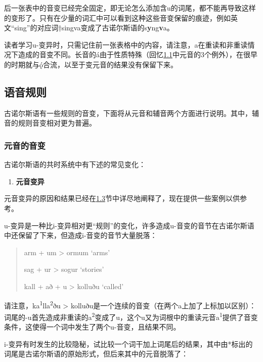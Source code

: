 后一张表中的音变已经完全固定，即无论怎么添加含u的词尾，都不能再导致这样的变形了。只有在少量的词汇中可以看到这种这些音变保留的痕迹，例如英文``sing''的对应词†singva变成了古诺尔斯语的s\textbf{y}ng\textbf{v}a。

读者学习u-变异时，只需记住前一张表格中的内容，请注意，a在重读和非重读情况下造成的音变不同。长音的á由于性质特殊（回忆\hyperref[ux4e66ux5199ux7cfbux7edfux548cux8bfbux97f3]{1.1}中元音的3个例外），在很早的时期就与ǫ́合流，以至于变元音的结果没有保留下来。

\subsection{语音规则}\label{ux8bedux97f3ux89c4ux5219}

古诺尔斯语有一些规则的音变，下面将从元音和辅音两个方面进行说明。其中，辅音的规则音变相对更为普遍。

\subsubsection{元音的音变}\label{ux5143ux97f3ux7684ux97f3ux53d8}

古诺尔斯语的共时系统中有下述的常见变化：

\begin{enumerate}
  \def\labelenumi{\Alph{enumi}.}
  \item
        \label{_Ref117017033}{}\textbf{元音变异}
\end{enumerate}

元音变异的原因和结果已经在\hyperref[ux53d8ux5143ux97f3]{1.3}节中详尽地阐释了，现在提供一些案例以供参考。

u-变异是一种比i-变异相对更``规则''的变化，许多造成u-音变的音节在古诺尔斯语中还保留了下来，但造成i-音变的音节大量脱落：

\begin{quote}
  arm + um \textgreater{} ormum `arms'

  sag + ur \textgreater{} sogur `stories'

  kall + að + u \textgreater{} kolluðu `called'
\end{quote}

请注意，ka\textsuperscript{1}lla\textsuperscript{2}ðu \textgreater{}
kolluðu是一个连续的音变（在两个a上加了上标加以区别）：词尾的-u首先造成非重读的a\textsuperscript{2}变成了u，这个u又为词根中的重读元音a\textsuperscript{1}提供了音变条件，这使得一个词中发生了两个u-音变，且结果不同。

i-变异有时发生的比较隐秘，试比较一个词干加上词尾后的结果，其中由*标出的词尾是古诺尔斯语的原始形式，但后来其中的元音脱落了：

